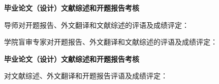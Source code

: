 \cleardoublepage


{
    \begin{center}
        \bfseries {} 毕业论文（设计）文献综述和开题报告考核
    \end{center}
    \bfseries

    {
        \noindent 导师对开题报告、外文翻译和文献综述的评语及成绩评定：
    }

    \vspace{50mm}

    \thesisproposaleval[][][]

    \signature{导师签名}

    {
        \noindent 学院盲审专家对开题报告、外文翻译和文献综述的评语及成绩评定：
    }


    \mbox{} \vfill
    \thesisproposaleval
    \signature{开题报告审核负责人（签名/签章）}
}
{
    \begin{center}
        \bfseries {} 毕业论文（设计）文献综述和开题报告考核
    \end{center}

    \bfseries

    {
        \noindent 对文献综述、外文翻译和开题报告评语及成绩评定：
    }


    \mbox{} \vfill
    \thesisproposaleval
    \signature{开题报告答辩小组负责人（签名）}
}
